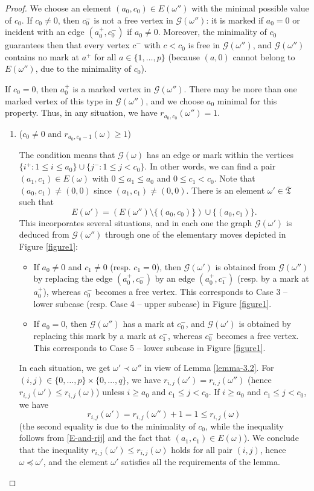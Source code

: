 \documentclass[ALCO,Unicode]{cedram}
\newcommand{\ppermutationsof}{\mathfrak{T}}
\newcommand{\parameters}{\overline{\ppermutationsof}}
\begin{document}
\begin{proof}
We choose an element $(a_0,c_0)\in E(\omega'') $ with the minimal possible value of $c_0$.
If $c_0\not=0$, then $c_0^-$ is not a free vertex in $\mathcal{G}(\omega'')$: it is marked if $a_0=0$ or incident with an edge $(a_0^+,c_0^-)$ if $a_0\not=0$. Moreover, the minimality of $c_0$ guarantees then that every vertex $c^-$ with $c<c_0$ is free in $\mathcal{G}(\omega'')$, and $\mathcal{G}(\omega'')$ contains no mark at $a^+$ for all $a\in\{1,\ldots,p\}$ (because $(a,0)$ cannot belong to $E(\omega'')$, due to the minimality of $c_0$).

If $c_0=0$, then $a_0^+$ is a marked vertex in $\mathcal{G}(\omega'')$.
There may be more than one marked vertex of this type in $\mathcal{G}(\omega'')$, and we choose $a_0$ minimal for this property. Thus, in any situation, we have $r_{a_0,c_0}(\omega'')=1$.

\begin{enumerate}[label=\textbf{Case \arabic*}]
\item ($c_0\not=0$ and $r_{a_0,c_0-1}(\omega)\geq 1$)

\noindent The condition means that $\mathcal{G}(\omega)$ has an edge or mark within the vertices $\{i^+:1\leq i\leq a_0\}\cup\{j^-:1\leq j<c_0\}$.
In other words, we can find a pair $(a_1,c_1)\in E(\omega)$
with $0\leq a_1\leq a_0$ and $0\leq c_1<c_0$.
Note that $(a_0,c_1)\not=(0,0)$ since $(a_1,c_1)\not=(0,0)$.
There is an element
$\omega'\in\parameters$ such that
\[
E(\omega')=(E(\omega'')\setminus\{(a_0,c_0)\})\cup\{(a_0,c_1)\}.
\]
This incorporates several situations, and in each one the graph $\mathcal{G}(\omega')$ is deduced from $\mathcal{G}(\omega'')$ through one of the elementary moves depicted in Figure \ref{figure1}:
\begin{itemize}
\item If $a_0\not=0$ and $c_1\not=0$ (resp. $c_1=0$), then $\mathcal{G}(\omega')$ is obtained from $\mathcal{G}(\omega'')$ by replacing
the edge $(a_0^+,c_0^-)$ by an edge $(a_0^+,c_1^-)$ (resp. by a mark
at $a_0^+$), whereas $c_0^-$ becomes a free vertex. This
corresponds to Case 3 -- lower subcase (resp. Case 4 -- upper
subcase) in Figure \ref{figure1}.
\item If $a_0=0$, then $\mathcal{G}(\omega'')$
has a mark at $c_0^-$, and $\mathcal{G}(\omega')$
is obtained by replacing this mark by a mark at $c_1^-$, whereas $c_0^-$ becomes a free vertex.
This corresponds to Case 5 -- lower subcase in Figure \ref{figure1}.
\end{itemize}
In each situation, we get $\omega'\prec\omega''$ in view of Lemma \ref{lemma-3.2}.
For $(i,j)\in\{0,\ldots,p\}\times\{0,\ldots,q\}$, we have
$r_{i,j}(\omega')=r_{i,j}(\omega'')$ (hence $r_{i,j}(\omega')\leq r_{i,j}(\omega)$) unless $i\geq a_0$ and $c_1\leq j<c_0$.
If $i\geq a_0$ and $c_1\leq j<c_0$, we have
\[r_{i,j}(\omega')=r_{i,j}(\omega'')+1=1\leq r_{i,j}(\omega)\]
(the second equality is due to the minimality of $c_0$, while the inequality follows from \eqref{E-and-rij} and the fact that $(a_1,c_1)\in E(\omega)$). We conclude that the inequality $r_{i,j}(\omega')\leq r_{i,j}(\omega)$ holds for all pair $(i,j)$, hence $\omega\preceq\omega'$, and the element $\omega'$ satisfies all the requirements of the lemma.




\end{enumerate}
\end{proof}
\end{document}

